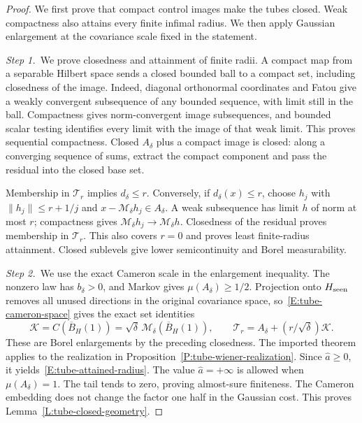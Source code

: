\begin{proof}
  We first prove that compact control images make the tubes closed. Weak
  compactness also attains every finite infimal radius. We then apply Gaussian
  enlargement at the covariance scale fixed in the statement.


  \medskip
  \noindent\textit{Step 1.~}We prove closedness and attainment of finite
  radii.
  A compact map from a separable Hilbert space sends a closed bounded ball to a
  compact set, including closedness of the image. Indeed, diagonal orthonormal
  coordinates and Fatou give a weakly convergent subsequence of any bounded
  sequence, with limit still in the ball. Compactness gives norm-convergent
  image subsequences, and bounded scalar testing identifies every limit with the
  image of that weak limit. This proves sequential compactness. Closed
  $A_\delta$ plus a compact image is closed: along a converging sequence of
  sums, extract the compact component and pass the residual into the closed base
  set.

  Membership in $\mathcal{T}_r$ implies $d_\delta \le r$. Conversely, if
  $d_\delta(x) \le r$, choose $h_j$ with $\|h_j\| \le r+1/j$ and
  $x-\mathcal{M}_\delta h_j \in A_\delta$. A weak subsequence has limit $h$ of
  norm at most $r$; compactness gives $\mathcal{M}_\delta h_j \to
  \mathcal{M}_\delta h$. Closedness of the residual proves membership in
  $\mathcal{T}_r$. This also covers $r = 0$ and proves least finite-radius
  attainment. Closed sublevels give lower semicontinuity and Borel
  measurability.


  \medskip
  \noindent\textit{Step 2.~}We use the exact Cameron scale in the enlargement
  inequality.
  The nonzero law has $b_\delta > 0$, and Markov gives $\mu(A_\delta) \ge 1/2$.
  Projection onto $H_{\rm seen}$ removes all unused directions in the original
  covariance space, so~\eqref{E:tube-cameron-space} gives the exact set
  identities
  \[
    \mathcal{K}=C(\overline{B}_H(1))
    =\sqrt\delta\,\mathcal{M}_\delta(\overline{B}_H(1)),\qquad
    \mathcal{T}_r=A_\delta+(r/\sqrt\delta)\mathcal{K} .
  \]
  These are Borel enlargements by the preceding closedness. The imported theorem
  applies to the realization in Proposition~\ref{P:tube-wiener-realization}.
  Since $\widehat{a} \ge 0$, it yields~\eqref{E:tube-attained-radius}. The value
  $\widehat{a} = +\infty$ is allowed when $\mu(A_\delta) = 1$. The tail tends to
  zero, proving almost-sure finiteness. The Cameron embedding does not change
  the factor one half in the Gaussian cost. This proves
  Lemma~\ref{L:tube-closed-geometry}.
\end{proof}

